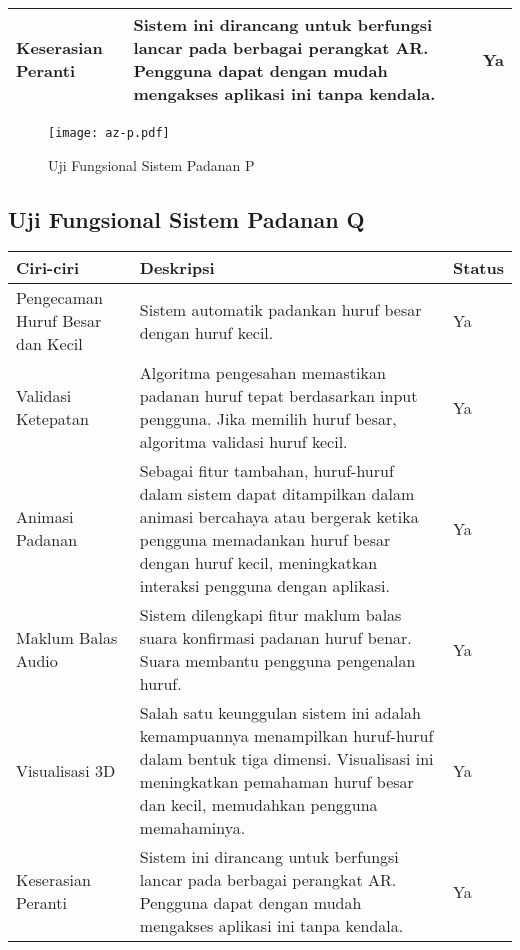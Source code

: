 \begin{itemize}
\begin{itemize}
\begin{itemize}
\begin{itemize}
\begin{itemize}
\begin{itemize}
\begin{itemize}
\begin{itemize}
\begin{flushleft}
\begin{tabular}{>{\raggedright}p{3cm}p{9cm}>{\centering\arraybackslash}p{2cm}}
Keserasian Peranti & Sistem ini dirancang untuk berfungsi lancar pada berbagai perangkat AR. Pengguna dapat dengan mudah mengakses aplikasi ini tanpa kendala. & Ya \\
\bottomrule
\end{tabular}

\begin{figure}
    \centering
    \texttt{[image: az-p.pdf]}
    \caption{Uji Fungsional  Sistem Padanan P }
    \label{fig:az-p.pdf}
\end{figure}

\subsection{Uji Fungsional  Sistem Padanan Q}

\begin{tabular}{>{\raggedright}p{3cm}p{9cm}>{\centering\arraybackslash}p{2cm}}
\toprule
\textbf{Ciri-ciri} & \textbf{Deskripsi} & \textbf{Status} \\
\midrule
Pengecaman Huruf Besar dan Kecil & Sistem automatik padankan huruf besar dengan huruf kecil. & Ya \\

Validasi Ketepatan & Algoritma pengesahan memastikan padanan huruf tepat berdasarkan input pengguna. Jika memilih huruf besar, algoritma validasi huruf kecil. & Ya \\

Animasi Padanan & Sebagai fitur tambahan, huruf-huruf dalam sistem dapat ditampilkan dalam animasi bercahaya atau bergerak ketika pengguna memadankan huruf besar dengan huruf kecil, meningkatkan interaksi pengguna dengan aplikasi. & Ya \\

Maklum Balas Audio & Sistem dilengkapi fitur maklum balas suara konfirmasi padanan huruf benar. Suara membantu pengguna pengenalan huruf. & Ya \\

Visualisasi 3D & Salah satu keunggulan sistem ini adalah kemampuannya menampilkan huruf-huruf dalam bentuk tiga dimensi. Visualisasi ini meningkatkan pemahaman huruf besar dan kecil, memudahkan pengguna memahaminya. & Ya \\

Keserasian Peranti & Sistem ini dirancang untuk berfungsi lancar pada berbagai perangkat AR. Pengguna dapat dengan mudah mengakses aplikasi ini tanpa kendala. & Ya \\
\bottomrule
\end{tabular}


\end{flushleft}
\end{itemize}
\end{itemize}
\end{itemize}
\end{itemize}
\end{itemize}
\end{itemize}
\end{itemize}
\end{itemize}
